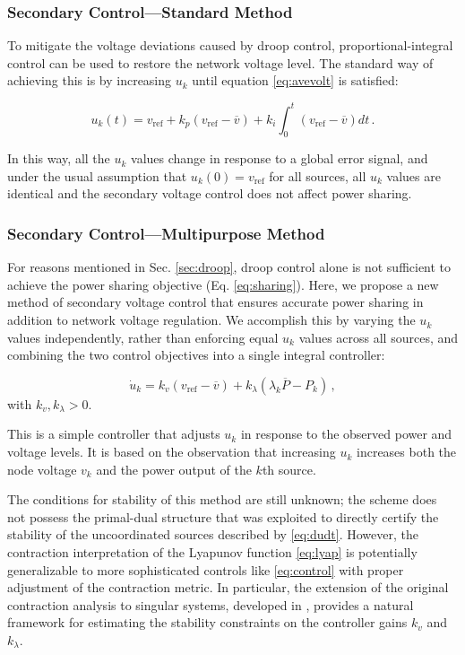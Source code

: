 \documentclass[letterpaper, 10 pt, conference]{ieeeconf}
\begin{document}
\subsubsection{Secondary Control---Standard Method}

To mitigate the voltage deviations caused by droop control, proportional-integral control can be used to restore the network voltage level. The standard way of achieving this is by increasing $u_k$ until equation \eqref{eq:avevolt} is satisfied:

\begin{equation}\label{eq:std_voltage}
u_k(t) = v_{\mathrm{ref}} + k_p(v_{\mathrm{ref}} - \overline{v}) + k_i \int_0^t (v_{\mathrm{ref}} - \overline{v})dt \,.
\end{equation}

In this way, all the $u_k$ values change in response to a global error signal, and under the usual assumption that $u_k(0) = v_{\mathrm{ref}}$ for all sources, all $u_k$ values are identical and the secondary voltage control does not affect power sharing.

\subsubsection{Secondary Control---Multipurpose Method}

For reasons mentioned in Sec. \ref{sec:droop}, droop control alone is not sufficient to achieve the power sharing objective (Eq. \eqref{eq:sharing}). Here, we propose a new method of secondary voltage control that ensures accurate power sharing in addition to network voltage regulation. We accomplish this by varying the $u_k$ values independently, rather than enforcing equal $u_k$ values across all sources, and combining the two control objectives into a single integral controller:

\begin{equation}\label{eq:control}
    \dot{u}_k = k_v (v_{\mathrm{ref}} - \overline{v}) + k_\lambda (\lambda_k \overline{P} - P_{k})\,,
\end{equation}
with $k_{v}, k_\lambda > 0$.

This is a simple controller that adjusts $u_k$ in response to the observed power and voltage levels. It is based on the observation that increasing $u_k$ increases both the node voltage $v_k$ and the power output of the $k$th source.

The conditions for stability of this method are still unknown; the scheme does not possess the primal-dual structure that was exploited to directly certify the stability of the uncoordinated sources described by \eqref{eq:dudt}. However, the contraction interpretation of the Lyapunov function \eqref{eq:lyap} is potentially generalizable to more sophisticated controls like \eqref{eq:control} with proper adjustment of the contraction metric. In particular, the extension of the original contraction analysis to singular systems, developed in  \cite{del2013contraction,bousquet2015contraction}, provides a natural framework for estimating the stability constraints on the controller gains $k_v$ and $k_\lambda$.
\end{document}
